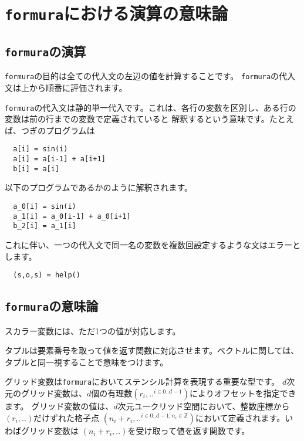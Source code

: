 \documentclass{jsarticle}
\newcommand{\bbZ}{\mathbb{Z}}
\newcommand{\formura}{{\texttt{formura}}}
\begin{document}
\newpage





\section{\formura における演算の意味論}

%




\subsection{\formura の演算}

\formura の目的は全ての代入文の左辺の値を計算することです。
\formura の代入文は上から順番に評価されます。

\formura の代入文は静的単一代入です。これは、各行の変数を区別し、ある行の変数は前の行までの変数で定義されていると
解釈するという意味です。たとえば、つぎのプログラムは

\begin{lstlisting}
  a[i] = sin(i)
  a[i] = a[i-1] + a[i+1]
  b[i] = a[i]
\end{lstlisting}


以下のプログラムであるかのように解釈されます。
\begin{lstlisting}
  a_0[i] = sin(i)
  a_1[i] = a_0[i-1] + a_0[i+1]
  b_2[i] = a_1[i]
\end{lstlisting}


これに伴い、一つの代入文で同一名の変数を複数回設定するような文はエラーとします。
\begin{lstlisting}
  (s,o,s) = help()
\end{lstlisting}




\subsection{\formura の意味論}


スカラー変数には、ただ1つの値が対応します。

タプルは要素番号を取って値を返す関数に対応させます。ベクトルに関しては、タプルと同一視することで意味をつけます。

グリッド変数は\formura においてステンシル計算を表現する重要な型です。
$d$次元のグリッド変数は、$d$個の有理数$(r_i, .. ^{i \in 0 .. d-1})$によりオフセットを指定できます。
グリッド変数の値は、$d$次元ユークリッド空間において、整数座標から$(r_i, ..)$だけずれた格子点
$(n_i + r_i , .. ^{i \in 0..d-1, n_i \in \bbZ})$において定義されます。いわばグリッド変数は
$(n_i + r_i , ..)$を受け取って値を返す関数です。
\end{document}
